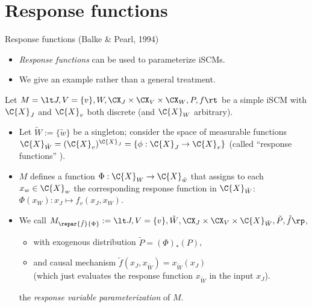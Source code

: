 \part{Response functions}
\frame{\partpage}

\begin{frame}{Response functions (Balke \& Pearl, 1994)}
  \begin{itemize}
    \item \emph{Response functions} can be used to parameterize iSCMs.
    \item We give an example rather than a general treatment.
  \end{itemize}

\begin{Def}[\ref{def:response_functions}]
  Let $M = \lt J, V=\{v\}, W, \CX_J \times \CX_V \times \CX_W, P, f \rt$ be a simple iSCM
  with $\C{X}_J$ and $\C{X}_v$ both discrete (and $\C{X}_W$ arbitrary).
  \begin{itemize}
    \item Let $\tilde{W}:=\{\tilde{w}\}$ be a singleton; consider the space of measurable functions
      $\C{X}_{\tilde{W}} = (\C{X}_v)^{\C{X}_J} = \{\phi : \C{X}_J \to \C{X}_v\}$
      (called ``response functions'' \cite{BalkePearl1994b}).
  \item $M$ defines a function $\Phi : \C{X}_W \to \C{X}_{\tilde{w}}$ that assigns to each $x_w \in \C{X}_w$ the corresponding response function in $\C{X}_{\tilde{W}}$:
  $\Phi(x_W) : x_J \mapsto f_v(x_J, x_W)$.
\item We call $M_{\repar{\tilde{f}}{\Phi}} := \lt J, V=\{v\}, \tilde{W}, \CX_J \times \CX_V \times \C{X}_{\tilde{W}}, \tilde{P}, \tilde{f} \rp$,
    \begin{itemize}
      \item with exogenous distribution $\tilde{P} = (\Phi)_* (P)$,
      \item and causal mechanism $\tilde{f}(x_J,x_{\tilde{W}}) = x_{\tilde{W}}(x_J)$\\
        (which just evaluates the response function $x_{\tilde{W}}$ in the input $x_J$).
    \end{itemize}
    the \emph{response variable parameterization} of $M$.
  \end{itemize}
  \end{Def}
\end{frame}

